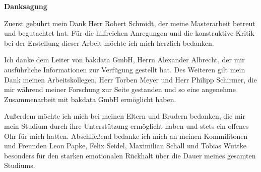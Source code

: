 \vspace*{\fill}
\begin{center}\textsf{\textbf{Danksagung}}\end{center}

\noindent Zuerst gebührt mein Dank Herr Robert Schmidt, der meine Masterarbeit betreut und begutachtet hat. Für die hilfreichen Anregungen und die konstruktive Kritik bei der Erstellung dieser Arbeit möchte ich mich herzlich bedanken.

\noindent Ich danke dem Leiter von bakdata GmbH, Herrn Alexander Albrecht, der mir ausführliche Informationen zur Verfügung gestellt hat. Des Weiteren gilt mein Dank meinen Arbeitskollegen, Herr Torben Meyer und Herr Philipp Schirmer, die mir während meiner Forschung zur Seite gestanden und so eine angenehme Zusammenarbeit mit bakdata GmbH ermöglicht haben.

\noindent Außerdem möchte ich mich bei meinen Eltern und Brudern bedanken, die mir mein Studium durch ihre Unterstützung ermöglicht haben und stets ein offenes Ohr für mich hatten. Abschließend bedanke ich mich an meinen Kommilitonen und Freunden Leon Papke, Felix Seidel, Maximilian Schall und Tobias Wuttke besonders für den starken emotionalen Rückhalt über die Dauer meines gesamten Studiums.

\vspace*{\fill}